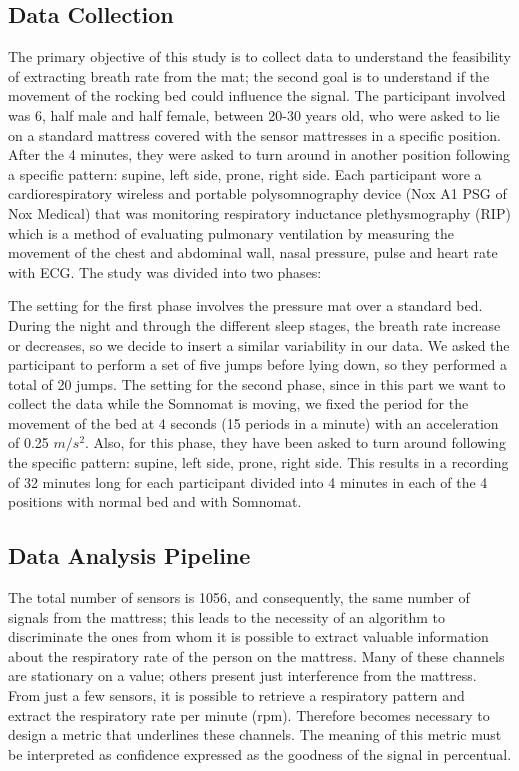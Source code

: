 \documentclass[a4paper,11pt, oneside,italian]{article}
\begin{document}
\subsection*{Data Collection}
The primary objective of this study is to collect data to understand the feasibility of extracting breath rate from the mat; the second goal is to understand if the movement of the rocking bed could influence the signal.
The participant involved was 6, half male and half female, between 20-30 years old, who were asked to lie on a standard mattress covered with the sensor mattresses in a specific position. 
After the 4 minutes, they were asked to turn around in another position following a specific pattern: supine, left side, prone, right side.
Each participant wore a cardiorespiratory wireless and portable polysomnography device (Nox A1 PSG of Nox Medical) that was
monitoring respiratory inductance plethysmography (RIP) which is a method of evaluating pulmonary ventilation by measuring the movement of the chest and abdominal wall, nasal pressure, pulse and heart rate with ECG. 
The study was divided into two phases:

The setting for the first phase involves the pressure mat over a standard bed. During the night and through the different sleep stages, the breath rate increase or decreases, so we decide to insert a similar variability in our data. We asked the participant to perform a set of five jumps before lying down, so they performed a total of 20 jumps.
The setting for the second phase, since in this part we want to collect the data while the Somnomat is moving, we fixed the period for the movement of the bed at 4 seconds (15 periods in a minute) with an acceleration of 0.25 $m/s^2$. Also, for this phase, they have been asked to turn around following the specific pattern: supine, left side, prone, right side.
This results in a recording of 32 minutes long for each participant divided into 4 minutes in each of the 4 positions with normal bed and with Somnomat.


\subsection*{Data Analysis Pipeline}
The total number of sensors is 1056, and consequently, the same number of signals from the mattress; this leads to the necessity of an algorithm to discriminate the ones from whom 
it is possible to extract valuable information about the respiratory rate of the person on the mattress.
Many of these channels are stationary on a value; others present just interference from the 
mattress. From just a few sensors, it is possible to retrieve a respiratory pattern and extract the 
respiratory rate per minute (rpm). Therefore becomes necessary to design a metric that underlines these channels.
The meaning of this metric must be interpreted as confidence expressed as the goodness of the signal in percentual.
\end{document}

